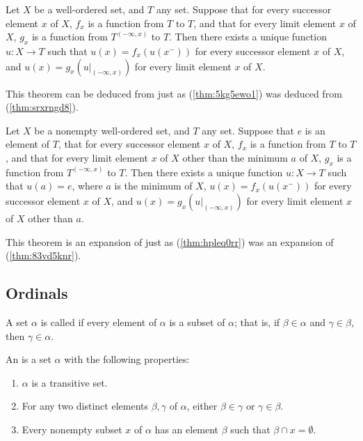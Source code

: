 \documentclass{article}
\begin{document}
\begin{theorem}
  \label{thm:a61v7g3m}
  Let \(X\) be a well-ordered set, and \(T\) any set.  Suppose that
  for every successor element \(x\) of \(X\), \(f_x\) is a function
  from \(T\) to \(T\), and that for every limit element \(x\) of
  \(X\), \(g_x\) is a function from \(T^{(-\infty, x)}\) to \(T\).
  Then there exists a unique function \(u : X \to T\) such that
  \(u(x) = f_x(u(x^-))\) for every successor element \(x\) of \(X\),
  and \(u(x) = g_x(u \vert_{(-\infty, x)})\) for every limit element
  \(x\) of \(X\).
\end{theorem}

This theorem can be deduced from  just as
(\ref{thm:5kg5ewo1}) was deduced from (\ref{thm:srxrngd8}).

\begin{theorem}
  \label{thm:e3bitdp0}
  Let \(X\) be a nonempty well-ordered set, and \(T\) any set.
  Suppose that \(e\) is an element of \(T\), that for every successor
  element \(x\) of \(X\), \(f_x\) is a function from \(T\) to \(T\),
  and that for every limit element \(x\) of \(X\) other than the
  minimum \(a\) of \(X\), \(g_x\) is a function from
  \(T^{(-\infty, x)}\) to \(T\).  Then there exists a unique function
  \(u : X \to T\) such that \(u(a) = e\), where \(a\) is the minimum
  of \(X\), \(u(x) = f_x(u(x^-))\) for every successor element \(x\)
  of \(X\), and \(u(x) = g_x(u \vert_{(-\infty, x)})\) for every limit
  element \(x\) of \(X\) other than \(a\).
\end{theorem}

This theorem is an expansion of  just as
(\ref{thm:hpleq0rr}) was an expansion of (\ref{thm:83vd5knr}).

\subsection{Ordinals}
\label{sec:t851d2lg}

A set \(\alpha\) is called  if every element of
\(\alpha\) is a subset of \(\alpha\); that is, if \(\beta \in \alpha\)
and \(\gamma \in \beta\), then \(\gamma \in \alpha\).

An  is a set \(\alpha\) with the following
properties:
\begin{enumerate}
\item \(\alpha\) is a transitive set.
\item For any two distinct elements \(\beta, \gamma\) of \(\alpha\),
  either \(\beta \in \gamma\) or \(\gamma \in \beta\).
\item Every nonempty subset \(x\) of \(\alpha\) has an element
  \(\beta\) such that \(\beta \cap x = \emptyset\).
\end{enumerate}
\end{document}
